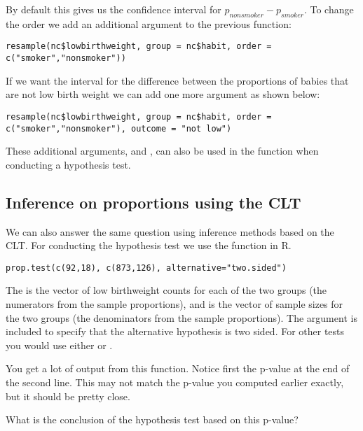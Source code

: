 \documentclass[11pt]{article}
\begin{document}
By default this gives us the confidence interval for $p_{non smoker} - p_{smoker}$. To change the order we add an additional argument to the previous function:

\begin{lstlisting}
resample(nc$lowbirthweight, group = nc$habit, order = c("smoker","nonsmoker"))
\end{lstlisting}

If we want the interval for the difference between the proportions of babies that are not low birth weight we can add one more argument as shown below:

\begin{lstlisting}
resample(nc$lowbirthweight, group = nc$habit, order = c("smoker","nonsmoker"), outcome = "not low")
\end{lstlisting}

These additional arguments,  and , can also be used in the  function when conducting a hypothesis test.

\subsection*{Inference on proportions using the CLT}

We can also answer the same question using inference methods based on the CLT. For conducting the hypothesis test we use the function  in R.

\begin{lstlisting}
prop.test(c(92,18), c(873,126), alternative="two.sided")
\end{lstlisting}

The  is the vector of low birthweight counts for each of the two groups (the numerators from the sample proportions), and  is the vector of sample sizes for the two groups (the denominators from the sample proportions).  The argument  is included to specify that the alternative hypothesis is two sided.  For other tests you would use either  or . 

You get a lot of output from this function.  Notice first the p-value at the end of the second line.  This may not match the p-value you computed earlier exactly, but it should be pretty close.

\begin{exercise}
What is the conclusion of the hypothesis test based on this p-value?
\end{exercise}
\end{document}
